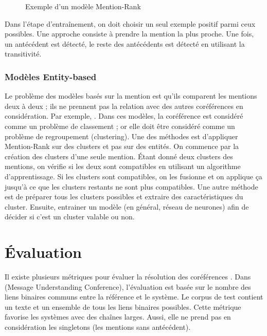 \documentclass{KodeBook}
\begin{document}
\begin{figure}[ht]
	\centering
	\caption[Exemple d'un modèle Mention-Rank]{Exemple d'un modèle Mention-Rank \cite{2019-jurafsky-martin}}
	\label{fig:mention-rank-exp}
\end{figure}

Dans l'étape d'entraînement, on doit choisir un seul exemple positif parmi ceux possibles. 
Une approche consiste à prendre la mention la plus proche.
Une fois, un antécédent est détecté, le reste des antécédents est détecté en utilisant la transitivité. 

\subsubsection{Modèles Entity-based}

Le problème des modèles basés sur la mention est qu'ils comparent les mentions deux à deux ; ils ne prennent pas la relation avec des autres coréférences en considération.
Par exemple, .
Dans ces modèles, la coréférence est considéré comme un problème de classement ; or elle doit être considéré comme un problème de regroupement (clustering). 
Une des méthodes est d'appliquer Mention-Rank sur des clusters et pas sur des entités. 
On commence par la création des clusters d'une seule mention. 
Étant donné deux clusters des mentions, on vérifie si les deux sont compatibles en utilisant un algorithme d'apprentissage.
Si les clusters sont compatibles, on les fusionne et on applique ça jusqu'à ce que les clusters restants ne sont plus compatibles.
Une autre méthode est de préparer tous les clusters possibles et extraire des caractéristiques du cluster.
Ensuite, entrainer un modèle (en général, réseau de neurones) afin de décider si c'est un cluster valable ou non.

\section{Évaluation}

Il existe plusieurs métriques pour évaluer la résolution des coréférences \cite{2016-moosavi-strube}.
Dans  (Message Understanding Conference), l'évaluation est basée sur le nombre des liens binaires communs entre la référence et le système.
Le corpus de test contient un texte et un ensemble de tous les liens binaires possibles. 
Cette métrique favorise les systèmes avec des chaînes larges. 
Aussi, elle ne prend pas en considération les singletons (les mentions sans antécédent).
\end{document}
